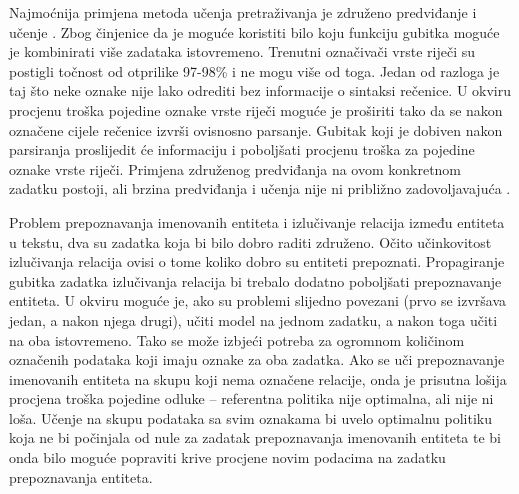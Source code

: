 Najmoćnija primjena metoda učenja pretraživanja je združeno predviđanje i učenje
. Zbog činjenice da je moguće koristiti bilo
koju funkciju gubitka moguće je kombinirati više zadataka istovremeno. Trenutni
označivači vrste riječi su postigli točnost od otprilike 97-98\%
\citep{manning2011part} i ne mogu više od toga. Jedan od razloga je taj što neke
oznake nije lako odrediti bez informacije o sintaksi rečenice. U \lts{} okviru
procjenu troška pojedine oznake vrste riječi moguće je proširiti tako da se
nakon označene cijele rečenice izvrši ovisnosno parsanje. Gubitak koji je
dobiven nakon parsiranja proslijedit će informaciju i poboljšati procjenu
troška za pojedine oznake vrste riječi. Primjena združenog predviđanja na ovom
konkretnom zadatku postoji, ali brzina predviđanja i učenja nije ni približno
zadovoljavajuća \citep{bohnet2012transition}.

Problem prepoznavanja imenovanih entiteta i izlučivanje relacija između entiteta
u tekstu, dva su zadatka koja bi bilo dobro raditi združeno. Očito učinkovitost
izlučivanja relacija ovisi o tome koliko dobro su entiteti prepoznati.
Propagiranje gubitka zadatka izlučivanja relacija bi trebalo dodatno poboljšati
prepoznavanje entiteta. U \lts{} okviru moguće je, ako su problemi slijedno
povezani (prvo se izvršava jedan, a nakon njega drugi), učiti model na jednom
zadatku, a nakon toga učiti na oba istovremeno. Tako se može izbjeći potreba za
ogromnom količinom označenih podataka koji imaju oznake za oba zadatka. Ako se
uči prepoznavanje imenovanih entiteta na skupu koji nema označene relacije, onda
je prisutna lošija procjena troška pojedine odluke -- referentna politika nije
optimalna, ali nije ni loša. Učenje na skupu podataka sa svim oznakama bi
uvelo optimalnu politiku koja ne bi počinjala od nule za zadatak prepoznavanja
imenovanih entiteta te bi onda bilo moguće popraviti krive procjene novim
podacima na zadatku prepoznavanja entiteta.

